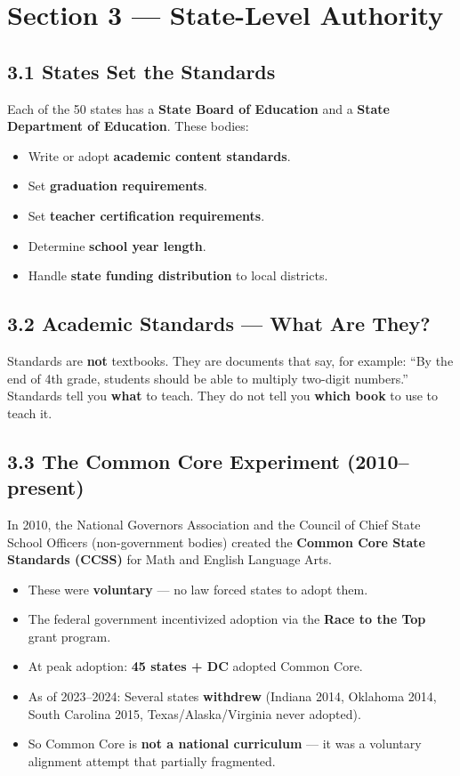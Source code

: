 	\section{Section 3 --- State-Level Authority}

	\subsection{3.1 States Set the Standards}

	Each of the 50 states has a \textbf{State Board of Education} and a \textbf{State Department of Education}. These bodies:
	\begin{itemize}
		\item Write or adopt \textbf{academic content standards}.
		\item Set \textbf{graduation requirements}.
		\item Set \textbf{teacher certification requirements}.
		\item Determine \textbf{school year length}.
		\item Handle \textbf{state funding distribution} to local districts.
	\end{itemize}

	\subsection{3.2 Academic Standards --- What Are They?}

	Standards are \textbf{not} textbooks. They are documents that say, for example: ``By the end of 4th grade, students should be able to multiply two-digit numbers.'' Standards tell you \textbf{what} to teach. They do not tell you \textbf{which book} to use to teach it.

	\subsection{3.3 The Common Core Experiment (2010--present)}

	In 2010, the National Governors Association and the Council of Chief State School Officers (non-government bodies) created the \textbf{Common Core State Standards (CCSS)} for Math and English Language Arts.

	\begin{itemize}
		\item These were \textbf{voluntary} --- no law forced states to adopt them.
		\item The federal government incentivized adoption via the \textbf{Race to the Top} grant program.
		\item At peak adoption: \textbf{45 states + DC} adopted Common Core.
		\item As of 2023--2024: Several states \textbf{withdrew} (Indiana 2014, Oklahoma 2014, South Carolina 2015, Texas/Alaska/Virginia never adopted).
		\item So Common Core is \textbf{not a national curriculum} --- it was a voluntary alignment attempt that partially fragmented.
	\end{itemize}

